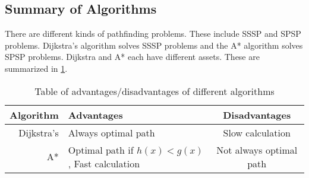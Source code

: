   \subsection{Summary of Algorithms}

  There are different kinds of pathfinding problems. These include SSSP and SPSP problems. Dijkstra's algorithm solves SSSP problems and the A* algorithm solves SPSP problems. Dijkstra and A* each have different assets. These are summarized in \cref{tbl:scheme}.
  
  \begin{table}[ht!]
    \centering
    \begin{tabular}{|r|l|c|}

      \hline
      \textbf{Algorithm} & \textbf{Advantages} & \textbf{Disadvantages} \\
      \hline
      Dijkstra's & Always optimal path & Slow calculation \\
      A* & Optimal path if $h(x)<g(x)$, Fast calculation & Not always optimal path \\
      \hline
    \end{tabular}
    \caption{Table of advantages/disadvantages of different algorithms}
    \label{tbl:scheme}
  \end{table}
